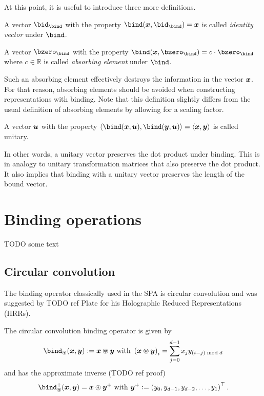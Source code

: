 At this point, it is useful to introduce three more definitions.
\begin{defn}
    A vector $\bid_{\bind}$ with the property $\bind(\vc x, \bid_{\bind}) = \vc x$ is called \emph{identity vector} under $\bind$.
\end{defn}
\begin{defn}
    A vector $\bzero_{\bind}$ with the property $\bind(\vc x, \bzero_{\bind}) = c \cdot \bzero_{\bind}$ where $c \in \mathbb{R}$ is called \emph{absorbing element} under $\bind$.
\end{defn}
Such an absorbing element effectively destroys the information in the vector $\bm{x}$.
For that reason, absorbing elements should be avoided when constructing representations with binding.
Note that this definition slightly differs from the usual definition of absorbing elements by allowing for a scaling factor.
\begin{defn}
    A vector $\bm{u}$ with the property $\langle \bind(\vc x, \vc u), \bind(\vc y, \vc u) \rangle = \langle \vc x, \vc y \rangle$ is called unitary.
\end{defn}
In other words, a unitary vector preserves the dot product under binding.
This is in analogy to unitary transformation matrices that also preserve the dot product.
It also implies that binding with a unitary vector preserves the length of the bound vector.


\section{Binding operations}
TODO some text

\subsection{Circular convolution}
The binding operator classically used in the SPA is circular convolution and was suggested by TODO ref Plate for his Holographic Reduced Representations (HRRs).
\begin{defn}
    The circular convolution binding operator is given by
    \begin{equation}
        \bind_{\circledast}(\vc x, \vc y) := \vc x \circledast \vc y\ \text{with}\ \del{\vc x \circledast \vc y}_i = \sum_{j=0}^{d - 1} x_j y_{(i - j) \bmod d}
    \end{equation}
    and has the approximate inverse (TODO ref proof)
    \begin{equation}
        \bind^+_{\circledast}(\vc x, \vc y) = \vc x \circledast \vc y^+\ \text{with}\ \vc y^+ := \del{y_0, y_{d-1}, y_{d-2}, \dotsc, y_1}\Tr \text{.}
    \end{equation}
\end{defn}


